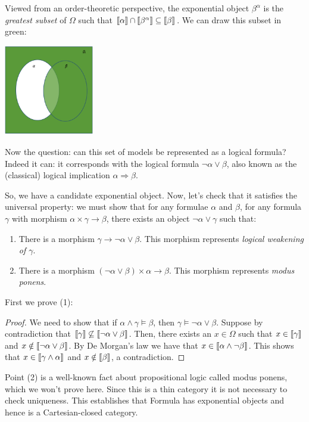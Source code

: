 Viewed from an order-theoretic perspective, the exponential object
$\beta^\alpha$ is the \emph{greatest subset} of $\Omega$ such that
$\left\llbracket \alpha \right\rrbracket \cap \left\llbracket \beta^\alpha \right\rrbracket \subseteq \left\llbracket \beta \right\rrbracket$. 
We can draw this subset in green:
\begin{center}
  \includegraphics[width=150px]{fig/venn-impl.png}
\end{center}

Now the question: can
this set of models be represented as a logical formula? Indeed it can:
it corresponds with the logical formula $\neg \alpha \lor \beta$, 
also known as the (classical) logical implication $\alpha \Rightarrow \beta$.

So, we have a candidate exponential object. Now, let's check that it 
satisfies the universal property: we 
must show that for any formulae $\alpha$ and $\beta$, 
for any formula $\gamma$ with morphism $\alpha \times \gamma \to \beta$, 
there exists an object $\neg \alpha \lor \gamma$ such that:
\begin{enumerate}
  \item There is a morphism $\gamma \to \neg \alpha \lor \beta$. This morphism represents \emph{logical weakening of $\gamma$}.
  \item There is a morphism $(\neg \alpha \lor \beta) \times \alpha \to \beta$. 
  This morphism represents \emph{modus ponens}.
\end{enumerate}
First we prove (1):
\begin{proof}
  We need to show that if $\alpha \land \gamma \models \beta$, then 
  $\gamma \models \neg \alpha \lor \beta$.
  Suppose by contradiction that $\left\llbracket \gamma \right\rrbracket \not\subseteq \left\llbracket \neg \alpha \lor \beta \right\rrbracket$.
  Then, there exists an $x \in \Omega$ such that $x \in \left\llbracket \gamma \right\rrbracket$
  and $x \notin \left\llbracket \neg \alpha \lor \beta \right\rrbracket$. 
  By De Morgan's law we have that $x \in \left\llbracket \alpha \land \neg \beta \right\rrbracket$. 
  This shows that $x \in \left\llbracket \gamma \land \alpha \right\rrbracket$ and $x \notin \left\llbracket \beta \right\rrbracket$, 
  a contradiction.
\end{proof}

Point (2) is a well-known fact about propositional logic called 
modus ponens, which we won't prove here.
Since this is a thin category it is not necessary to check uniqueness.
This establishes that \textsf{Formula} has exponential objects and 
hence is a Cartesian-closed category.


